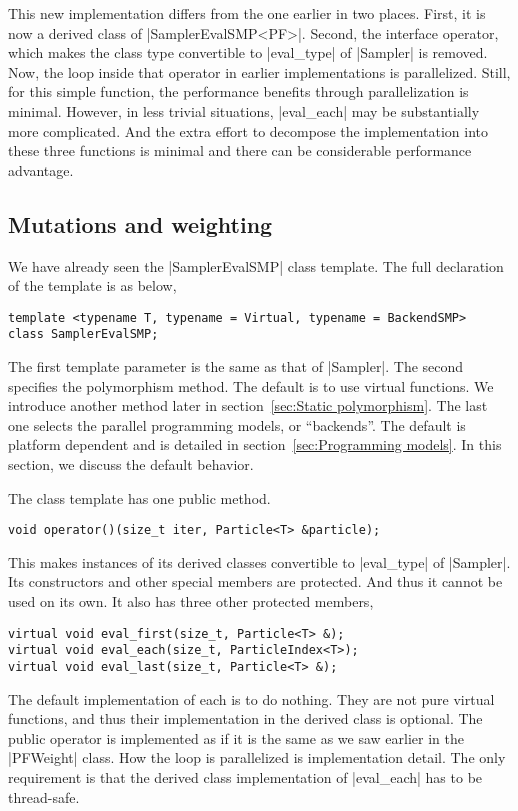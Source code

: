 This new implementation differs from the one earlier in two places. First, it
is now a derived class of |SamplerEvalSMP<PF>|. Second, the interface operator,
which makes the class type convertible to |eval_type| of |Sampler| is removed.
Now, the loop inside that operator in earlier implementations is parallelized.
Still, for this simple function, the performance benefits through
parallelization is minimal. However, in less trivial situations, |eval_each|
may be substantially more complicated. And the extra effort to decompose the
implementation into these three functions is minimal and there can be
considerable performance advantage.

\subsection{Mutations and weighting}
\label{sub:Mutations and weighting}

We have already seen the |SamplerEvalSMP| class template. The full declaration
of the template is as below,
\begin{verbatim}
template <typename T, typename = Virtual, typename = BackendSMP>
class SamplerEvalSMP;
\end{verbatim}
The first template parameter is the same as that of |Sampler|. The second
specifies the polymorphism method. The default is to use virtual functions. We
introduce another method later in section~\ref{sec:Static polymorphism}. The
last one selects the parallel programming models, or ``backends''. The default
is platform dependent and is detailed in section~\ref{sec:Programming models}.
In this section, we discuss the default behavior.

The class template has one public method.
\begin{verbatim}
void operator()(size_t iter, Particle<T> &particle);
\end{verbatim}
This makes instances of its derived classes convertible to |eval_type| of
|Sampler|. Its constructors and other special members are protected. And thus
it cannot be used on its own. It also has three other protected members,
\begin{verbatim}
virtual void eval_first(size_t, Particle<T> &);
virtual void eval_each(size_t, ParticleIndex<T>);
virtual void eval_last(size_t, Particle<T> &);
\end{verbatim}
The default implementation of each is to do nothing. They are not pure virtual
functions, and thus their implementation in the derived class is optional. The
public operator is implemented as if it is the same as we saw earlier in the
|PFWeight| class. How the loop is parallelized is implementation detail. The
only requirement is that the derived class implementation of |eval_each| has to
be thread-safe.

